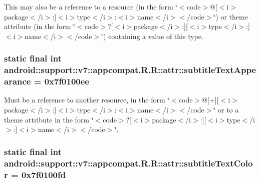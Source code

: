 This may also be a reference to a resource (in the form \char`\"{}$<$code$>$@\mbox{[}$<$i$>$package$<$/i$>$:\mbox{]}$<$i$>$type$<$/i$>$:$<$i$>$name$<$/i$>$$<$/code$>$\char`\"{}) or theme attribute (in the form \char`\"{}$<$code$>$?\mbox{[}$<$i$>$package$<$/i$>$:\mbox{]}\mbox{[}$<$i$>$type$<$/i$>$:\mbox{]}$<$i$>$name$<$/i$>$$<$/code$>$\char`\"{}) containing a value of this type. \hypertarget{classandroid_1_1support_1_1v7_1_1appcompat_1_1_r_1_1attr_1c59f17f993d7d052a999ef2dc8d5e2b}{
\subsubsection[{subtitleTextAppearance}]{\setlength{\rightskip}{0pt plus 5cm}static final int android::support::v7::appcompat.R.R::attr::subtitleTextAppearance = 0x7f0100ee}}
\label{classandroid_1_1support_1_1v7_1_1appcompat_1_1_r_1_1attr_1c59f17f993d7d052a999ef2dc8d5e2b}


Must be a reference to another resource, in the form \char`\"{}$<$code$>$@\mbox{[}+\mbox{]}\mbox{[}$<$i$>$package$<$/i$>$:\mbox{]}$<$i$>$type$<$/i$>$:$<$i$>$name$<$/i$>$$<$/code$>$\char`\"{} or to a theme attribute in the form \char`\"{}$<$code$>$?\mbox{[}$<$i$>$package$<$/i$>$:\mbox{]}\mbox{[}$<$i$>$type$<$/i$>$:\mbox{]}$<$i$>$name$<$/i$>$$<$/code$>$\char`\"{}. \hypertarget{classandroid_1_1support_1_1v7_1_1appcompat_1_1_r_1_1attr_74351340f58b8c9eb971541b58952925}{
\subsubsection[{subtitleTextColor}]{\setlength{\rightskip}{0pt plus 5cm}static final int android::support::v7::appcompat.R.R::attr::subtitleTextColor = 0x7f0100fd}}
\label{classandroid_1_1support_1_1v7_1_1appcompat_1_1_r_1_1attr_74351340f58b8c9eb971541b58952925}


